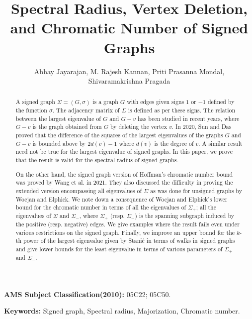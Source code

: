 \documentclass[12pt]{article}
\title{\textbf{Spectral Radius, Vertex Deletion, and Chromatic Number of Signed Graphs}}
\author{Abhay Jayarajan, M. Rajesh Kannan, Priti Prasanna Mondal, \\ Shivaramakrishna Pragada}
\theoremstyle{plain}
\numberwithin{equation}{section}
\begin{document}
	\maketitle{}
	
	\begin{abstract}
		A signed graph $\Sigma=(G,\sigma)$ is a graph $G$ with edges given signs $1$ or $-1$ defined by the function $\sigma$. The adjacency matrix of $\Sigma$ is defined as per these signs. The relation between the largest eigenvalue of $G$ and $G-v$ has been studied in recent years, where $G-v$ is the graph obtained from $G$ by deleting the vertex $v$. In 2020, Sun and Das proved that the difference of the squares of the largest eigenvalues of the graphs $G$ and $G-v$ is bounded above by $2d(v)-1$ where $d(v)$ is the degree of $v$. A similar result need not be true for the largest eigenvalue of signed graphs. In this paper, we prove that the result is valid for the spectral radius of signed graphs. 
		
		On the other hand, the signed graph version of Hoffman's chromatic number bound was proved by Wang et al. in 2021. They also discussed the difficulty in proving the extended version encompassing all eigenvalues of $\Sigma$ as was done for unsigned graphs by Wocjan and Elphick. We note down a consequence of Wocjan and Elphick's lower bound for the chromatic number in terms of all the eigenvalues of $\Sigma_+$; all the eigenvalues of $\Sigma$ and $\Sigma_-$, where $\Sigma_+$ (resp. $\Sigma_-$) is the spanning subgraph induced by the positive (resp. negative) edges. We give examples where the result fails even under various restrictions on the signed graph. Finally, we improve an upper bound for the $k$-th power of the largest eigenvalue given by Stani\'{c} in terms of walks in signed graphs and give lower bounds for the least eigenvalue in terms of various parameters of $\Sigma_+$ and $\Sigma_-$.
	\end{abstract}
	
	{\bf AMS Subject Classification(2010):} 05C22; 05C50.
	
	\textbf{Keywords:} Signed graph, Spectral radius, Majorization, Chromatic number.
	
\end{document}
